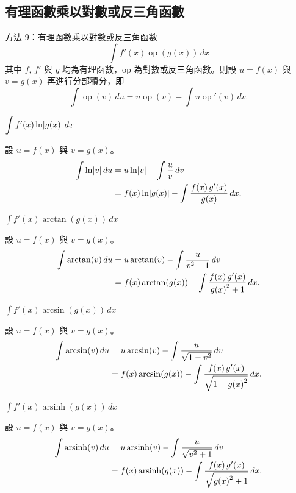 \documentclass{beamer}
\newcommand{\Left} {\mathopen{}\mathclose\bgroup\left}
\newcommand{\Right}{\aftergroup\egroup\right}
\newcommand{\arsinh}{\operatorname{arsinh}}
\newcommand{\op}  {\operatorname{op}}
\theoremstyle{remark}
\begin{document}
\subsection[有理函數乘以反函數]{有理函數乘以對數或反三角函數}
\begin{frame}{方法 9：有理函數乘以對數或反三角函數}
  \[\int f'(x) \op(g(x))\,dx\]
  其中 $f$, $f'$ 與 $g$ 均為有理函數，op 為對數或反三角函數。則設 $u = f(x)$ 與 $v = g(x)$ 再進行分部積分，即
  \[\int \op(v)\,du = u \op(v) - \int u \op'(v)\,dv.\]
\end{frame}

\begin{frame}{$\displaystyle \int f'(x) \ln \Left| g(x) \Right|\,dx$}
  \begin{solution}
    設 $u = f(x)$ 與 $v = g(x)$。
    \begin{align*}
      \int \ln \Left| v \Right|\,du &= u \ln \Left| v \Right| - \int \frac u v \,dv\\
	&= f(x) \ln \Left| g(x) \Right| - \int \frac{f(x)\,g'(x)}{g(x)}\,dx.
    \end{align*}
  \end{solution}
\end{frame}

\begin{frame}{$\displaystyle \int f'(x) \arctan(g(x))\,dx$}
  \begin{solution}
    設 $u = f(x)$ 與 $v = g(x)$。
    \begin{align*}
      \int \arctan(v)\,du &= u \arctan(v) - \int \frac{u}{v^2 + 1}\,dv\\
	&= f(x) \arctan(g(x)) - \int \frac{f(x)\,g'(x)}{g \Left( x \Right)^2 + 1}\,dx.
    \end{align*}
  \end{solution}
\end{frame}

\begin{frame}{$\displaystyle \int f'(x) \arcsin(g(x))\,dx$}
  \begin{solution}
    設 $u = f(x)$ 與 $v = g(x)$。
    \begin{align*}
      \int \arcsin(v)\,du &= u \arcsin(v) - \int \frac{u}{\sqrt{1 - v^2}}\,dv\\
	&= f(x) \arcsin(g(x)) - \int \frac{f(x)\,g'(x)}{\sqrt{1 - g \Left( x \Right)^2}}\,dx.
    \end{align*}
  \end{solution}
\end{frame}

\begin{frame}{$\displaystyle \int f'(x) \arsinh(g(x))\,dx$}
  \begin{solution}
    設 $u = f(x)$ 與 $v = g(x)$。
    \begin{align*}
      \int \arsinh(v)\,du &= u \arsinh(v) - \int \frac{u}{\sqrt{v^2 + 1}}\,dv\\
	&= f(x) \arsinh(g(x)) - \int \frac{f(x)\,g'(x)}{\sqrt{g \Left( x \Right)^2 + 1}}\,dx.
    \end{align*}
  \end{solution}
\end{frame}
\end{document}
